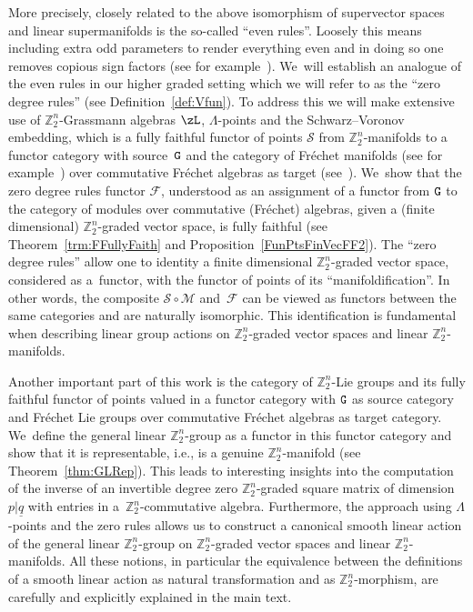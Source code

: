 \documentclass[10pt,a4paper]{amsart}
\newcommand{\Z}{{\mathbb Z}}
\def\ul{\underline}
\def\ul{\underline}
\newcommand{\0}{\otimes}
\newcommand{\z}{\Z_2^n}
\numberwithin{equation}{section}
\begin{document}
More precisely, closely related to the above isomorphism of supervector spaces and linear supermanifolds is the so-called ``even rules''. Loosely this means including extra odd parameters to render everything even and in doing so one removes copious sign factors (see for example~\cite[Section~1.7]{Deligne:1999}). We~will establish an analogue of the even rules in our higher graded setting which we will refer to as the ``zero degree rules'' (see Definition~\ref{def:Vfun}). To address this we will make extensive use of $\Z_2^n$-Grassmann algebras $\zL$, $\Lambda$-points and the Schwarz--Voronov embedding, which is a fully faithful functor of points $\mathcal{S}$ from $\z$-manifolds to a functor category with source~${\tt G}$ and the category of Fr\'echet manifolds (see for
example~\cite{Hamilton:82}) over commutative Fr\'echet algebras as target (see~\cite{Bruce:2019b}). We~show that the zero degree rules functor $\mathcal F$, understood as an assignment of a functor from ${\tt G}$ to the category of modules over commutative (Fr\'echet) algebras, given a (finite dimensional) $\Z_2^n$-graded vector space, is fully faithful (see Theorem~\ref{trm:FFullyFaith} and Proposition~\ref{FunPtsFinVecFF2}). The ``zero degree rules'' allow one to identity a finite dimensional $\Z_2^n$-graded vector space, considered as a~functor, with the functor of points of its ``manifoldification''. In other words, the composite $\mathcal{S}\circ\mathcal{M}$ and~$\mathcal{F}$ can be viewed as functors between the same categories and are naturally isomorphic. This identification is fundamental when describing linear group actions on $\Z_2^n$-graded vector spaces and linear $\Z_2^n$-manifolds.

Another important part of this work is the category of $\z$-Lie groups and its fully faithful functor of points valued in a functor category with ${\tt G}$ as source category and Fr\'echet Lie groups over commutative Fr\'echet algebras as target category. We~define the general linear $\Z_2^n$-group as a functor in this functor category and show that it is representable, i.e., is a genuine $\Z_2^n$-manifold (see Theorem~\ref{thm:GLRep}). This leads to interesting insights into the computation of the inverse of an invertible degree zero $\z$-graded square matrix of dimension $p|\ul q$ with entries in a~$\z$-commutative algebra. Furthermore, the approach using $\Lambda$-points and the zero rules allows us to construct a canonical smooth linear action of the general linear $\Z_2^n$-group on $\Z_2^n$-graded vector spaces and linear $\Z_2^n$-manifolds. All these notions, in particular the equivalence between the definitions of a smooth linear action as natural transformation and as $\z$-morphism, are carefully and explicitly explained in the main text.
\end{document}
